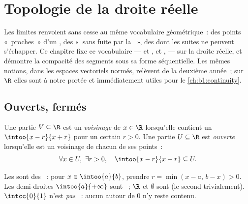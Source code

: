 \chapter{Topologie de la droite réelle}\label{ch:b1:topology}

Les limites renvoient sans cesse au même vocabulaire géométrique~: des
points «~proches~» d'un , des  «~sans fuite par la
~», des  dont les suites ne peuvent s'échapper. Ce
chapitre fixe ce vocabulaire ---  et ,  et
,  --- sur la droite réelle, et démontre la compacité
des segments sous sa forme séquentielle. Les mêmes notions, dans les
espaces vectoriels normés, relèvent de la deuxième année~; sur $\R$
elles sont à notre portée et immédiatement utiles pour
le \cref{ch:b1:continuity}.

\section{Ouverts, fermés}

\begin{definition}\label{def:b1:topology:open}
Une partie $V \subseteq \R$ est un \emph{voisinage}
de $x \in \R$ lorsqu'elle contient un  $\intoo{x - r}{x + r}$
pour un certain $r > 0$. Une partie $U \subseteq \R$ est
\emph{ouverte} lorsqu'elle est un voisinage de chacun de
ses points~:
\[
\forall x \in U,\ \exists r > 0, \quad \intoo{x - r}{x + r}
\subseteq U .
\]
\end{definition}

\begin{example}\label{ex:b1:topology:open}
Les   sont des ~: pour $x \in \intoo{a}{b}$,
prendre $r = \min(x - a,\, b - x) > 0$. Les demi-droites
$\intoo{a}{+\infty}$ sont ~; $\R$ et $\emptyset$ sont 
(le second trivialement). $\intcc{0}{1}$ n'est \emph{pas} ~:
aucun  autour de $0$ n'y reste contenu.
\end{example}

